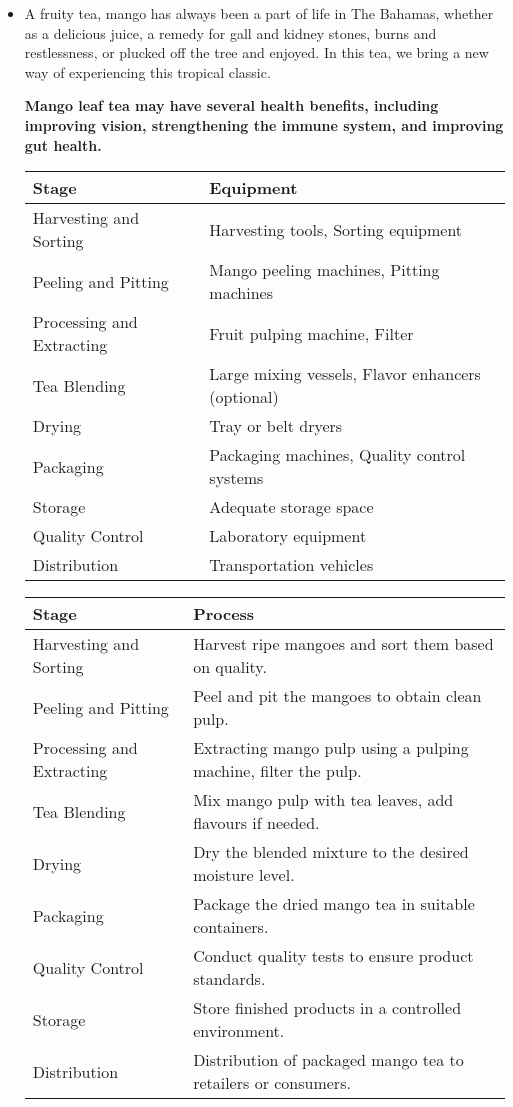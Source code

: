 \documentclass{article}
\begin{document}
\begin{itemize}
    \item A fruity tea, mango has always been a part of life in The Bahamas, whether as a delicious juice, a remedy for gall and kidney stones, burns and restlessness, or plucked off the tree and enjoyed. In this tea, we bring a new way of experiencing this tropical classic.\par
    \textbf{Mango leaf tea may have several health benefits, including improving vision, strengthening the immune system, and improving gut health.}\par
    \begin{tabularx}{\textwidth}{lX}
    \toprule
    \textbf{Stage} & \textbf{Equipment} \\
    \midrule
    Harvesting and Sorting & Harvesting tools, Sorting equipment \\
    Peeling and Pitting & Mango peeling machines, Pitting machines \\
    Processing and Extracting & Fruit pulping machine, Filter \\
    Tea Blending & Large mixing vessels, Flavor enhancers (optional) \\
    Drying & Tray or belt dryers \\
    Packaging & Packaging machines, Quality control systems \\
    Storage & Adequate storage space \\
    Quality Control & Laboratory equipment \\
    Distribution & Transportation vehicles \\
    \bottomrule
    \end{tabularx}

    \begin{tabularx}{\textwidth}{lX}
    \toprule
    \textbf{Stage} & \textbf{Process} \\
    \midrule
    Harvesting and Sorting & Harvest ripe mangoes and sort them based on quality. \\
    Peeling and Pitting & Peel and pit the mangoes to obtain clean pulp. \\
    Processing and Extracting & Extracting mango pulp using a pulping machine, filter the pulp. \\
    Tea Blending & Mix mango pulp with tea leaves, add flavours if needed. \\
    Drying & Dry the blended mixture to the desired moisture level. \\
    Packaging & Package the dried mango tea in suitable containers. \\
    Quality Control & Conduct quality tests to ensure product standards. \\
    Storage & Store finished products in a controlled environment. \\
    Distribution & Distribution of packaged mango tea to retailers or consumers. \\
    \bottomrule
    \end{tabularx}
    \end{itemize}
\end{document}
